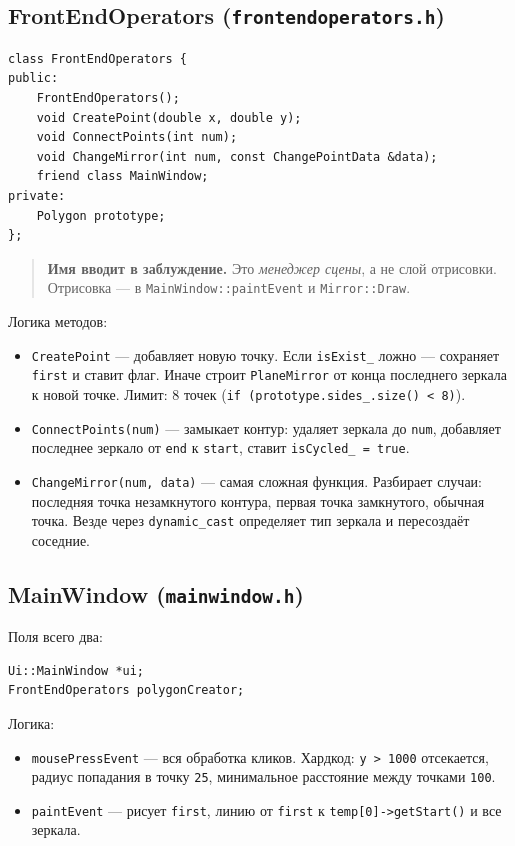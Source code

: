 \documentclass[a4paper,11pt]{article}
\newcommand{\file}[1]{\texttt{#1}}
\newcommand{\code}[1]{\texttt{#1}}
\begin{document}
\subsection{FrontEndOperators (\file{frontendoperators.h})}

\begin{lstlisting}[caption={FrontEndOperators}]
class FrontEndOperators {
public:
    FrontEndOperators();
    void CreatePoint(double x, double y);
    void ConnectPoints(int num);
    void ChangeMirror(int num, const ChangePointData &data);
    friend class MainWindow;
private:
    Polygon prototype;
};
\end{lstlisting}

\begin{quote}
\textbf{Имя вводит в заблуждение.} Это \emph{менеджер сцены}, а не слой
отрисовки. Отрисовка — в \code{MainWindow::paintEvent} и
\code{Mirror::Draw}.
\end{quote}

Логика методов:
\begin{itemize}[leftmargin=*]
    \item \code{CreatePoint} — добавляет новую точку.
          Если \code{isExist\_} ложно — сохраняет \code{first} и ставит
          флаг. Иначе строит \code{PlaneMirror} от конца последнего
          зеркала к новой точке. Лимит: 8 точек
          (\code{if (prototype.sides\_.size() < 8)}).
    \item \code{ConnectPoints(num)} — замыкает контур: удаляет
          зеркала до \code{num}, добавляет последнее зеркало от
          \code{end} к \code{start}, ставит \code{isCycled\_ = true}.
    \item \code{ChangeMirror(num, data)} — самая сложная функция.
          Разбирает случаи: последняя точка незамкнутого контура,
          первая точка замкнутого, обычная точка. Везде через
          \code{dynamic\_cast} определяет тип зеркала и пересоздаёт
          соседние.
\end{itemize}

\subsection{MainWindow (\file{mainwindow.h})}

Поля всего два:
\begin{lstlisting}
Ui::MainWindow *ui;
FrontEndOperators polygonCreator;
\end{lstlisting}

Логика:
\begin{itemize}[leftmargin=*]
    \item \code{mousePressEvent} — вся обработка кликов. Хардкод:
          \code{y > 1000} отсекается, радиус попадания в точку
          \code{25}, минимальное расстояние между точками \code{100}.
    \item \code{paintEvent} — рисует \code{first}, линию от \code{first}
          к \code{temp[0]->getStart()} и все зеркала.
\end{itemize}
\end{document}
